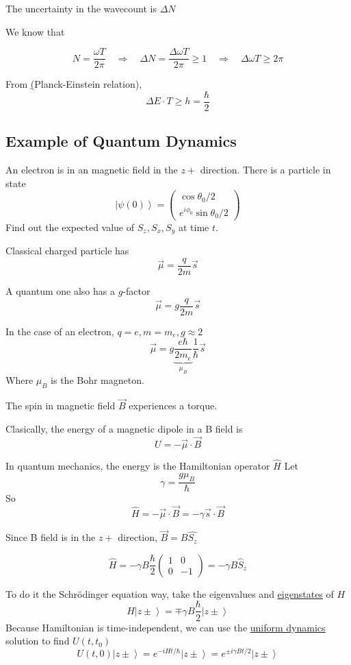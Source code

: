 \documentclass[
]{article}
\let\oldhyperref\hyperref
\renewcommand{\hyperref}[2][]{\oldhyperref[#1]{\underline{#2}}}
\providecommand{\ket}[1]{\left\lvert #1 \right\rangle}
\providecommand{\Rarr}{\Rightarrow}
\begin{document}
The uncertainty in the wavecount is $\Delta N$

We know that

\[
	N=\frac{\omega T}{2\pi} \quad\Rarr \quad \Delta N = \frac{\Delta \omega T}{2\pi} \geq 1 \quad \Rarr \quad \Delta \omega T \geq 2\pi
\]

From \hyperref[planck-einstein-relation](Planck-Einstein relation),
\[
	\Delta E \cdot T\geq h = \frac{\hbar}{2}
\]
\subsection{Example of Quantum Dynamics}\label{example-of-quantum-dynamics}
An electron is in an magnetic field in the $z+$ direction. There is a particle in state
\[
	\ket{\psi(0)}=\begin{pmatrix}\cos\theta_0/2 \\ e^{i\phi_0}\sin\theta_0/2\end{pmatrix}
\]
Find out the expected value of $S_z, S_x, S_y$ at time $t$.

Classical charged particle has
\[\vec{\mu}=\frac{q}{2m}\vec{s}\]

A quantum one also has a $g$-factor
\[\vec{\mu}=g\frac{q}{2m}\vec{s}\]

In the case of an electron, $q=e, m=m_e, g\approx 2$
\[
	\vec{\mu}=g\underbrace{\frac{e\hbar}{2m_e}}_{\mu_B}\frac{1}{\hbar}\vec{s}
\]
Where $\mu_B$ is the Bohr magneton.

The spin in magnetic field $\vec{B}$ experiences a torque.

Clasically, the energy of a magnetic dipole in a B field is
\[
	U=-\vec{\mu}\cdot\vec{B}
\]

In quantum mechanics, the energy is the Hamiltonian operator $\hat{H}$
Let
\[
	\gamma = \frac{g\mu_B}{\hbar}
\]
So
\[
	\hat{H}=-\vec{\mu}\cdot\vec{B}=-\gamma\vec{s}\cdot\vec{B}
\]

Since B field is in the $z+$ direction, $\vec{B}=B\hat{S_z}$

\[
	\hat{H}=-\gamma B \frac{\hbar}{2}\begin{pmatrix}1 & 0 \\ 0 & -1\end{pmatrix}=-\gamma B \hat{S}_z
\]

To do it the Schrödinger equation way, take the eigenvalues and \hyperref[eigenstates]{eigenstates} of $H$
\[
	H\ket{z\pm}=\mp\gamma B \frac{\hbar}{2}\ket{z\pm}
\]
Because Hamiltonian is time-independent, we can use the \hyperref[uniform-dynamics]{uniform dynamics} solution to find $U(t,t_0)$
\[
	U(t,0)\ket{z\pm}=e^{-iHt/\hbar}\ket{z\pm}=e^{\pm i\gamma B t/2}\ket{z\pm}
\]
\end{document}
